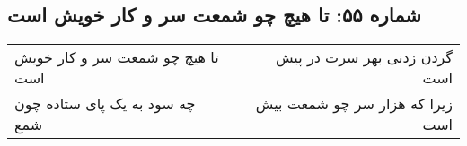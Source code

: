 \begin{center}
\section*{شماره ۵۵: تا هیچ چو شمعت سر و کار خویش است}
\label{sec:055}
\begin{longtable}{l p{0.5cm} r}
تا هیچ چو شمعت سر و کار خویش است
&&
گردن زدنی بهر سرت در پیش است
\\
چه سود به یک پای ستاده چون شمع
&&
زیرا که هزار سر چو شمعت بیش است
\\
\end{longtable}
\end{center}
